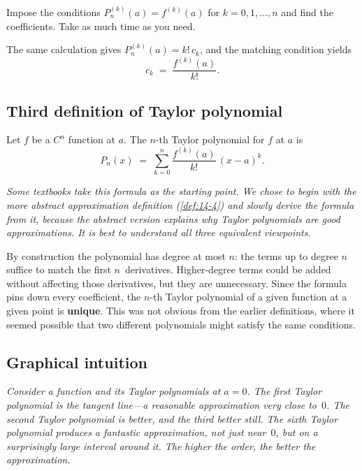 \begin{remark}
Impose the conditions $P_{n}^{(k)}(a)=f^{(k)}(a)$ for $k=0,1,\ldots,n$ and find the coefficients.  Take as much time as you need.
\end{remark}

The same calculation gives $P_{n}^{(k)}(a)=k!\,c_{k}$, and the matching condition yields
\[
  c_{k} \;=\; \frac{f^{(k)}(a)}{k!}.
\]

\subsection*{Third definition of Taylor polynomial}

\begin{definition}
\label{def:14-7}
Let $f$ be a $C^{n}$ function at $a$.  The $n$-th Taylor polynomial for $f$ at $a$ is
\[
  P_{n}(x) \;=\; \sum_{k=0}^{n}\frac{f^{(k)}(a)}{k!}\,(x-a)^{k}.
\]
\end{definition}

\textit{Some textbooks take this formula as the starting point.  We chose to begin with the more abstract approximation definition (\cref{def:14-4}) and slowly derive the formula from it, because the abstract version explains \emph{why} Taylor polynomials are good approximations.  It is best to understand all three equivalent viewpoints.}

\begin{remark}
By construction the polynomial has degree at most $n$: the terms up to degree $n$ suffice to match the first $n$~derivatives.  Higher-degree terms could be added without affecting those derivatives, but they are unnecessary.  Since the formula pins down every coefficient, the $n$-th Taylor polynomial of a given function at a given point is \textbf{unique}.  This was not obvious from the earlier definitions, where it seemed possible that two different polynomials might satisfy the same conditions.
\end{remark}

\subsection*{Graphical intuition}

\textit{Consider a function and its Taylor polynomials at $a=0$.  The first Taylor polynomial is the tangent line---a reasonable approximation very close to~$0$.  The second Taylor polynomial is better, and the third better still.  The sixth Taylor polynomial produces a fantastic approximation, not just near~$0$, but on a surprisingly large interval around it.  The higher the order, the better the approximation.}

